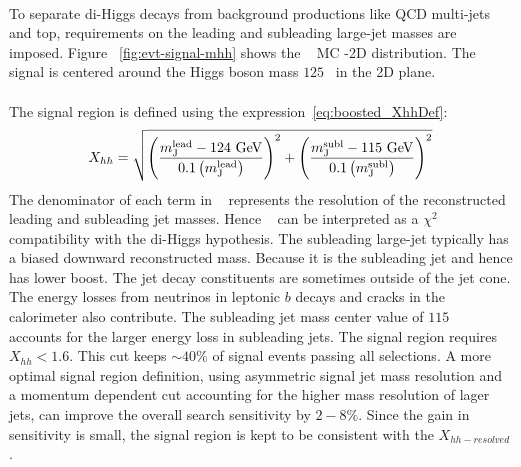 \paragraph{}
To separate di-Higgs decays from background productions like QCD multi-jets and top, requirements on the leading and subleading large-\R jet masses are imposed.
Figure ~\ref{fig:evt-signal-mhh} shows the \Grav~ MC \mleadJ-\msublJ 2D distribution.
The signal is centered around the Higgs boson mass $125$\GeV~ in the 2D plane.

\paragraph{}
The signal region is defined using the expression~\ref{eq:boosted_XhhDef}:
\begin{equation}
\label{eq:boosted_XhhDef}
X_{hh} = \sqrt{\left(\frac{m^{\rm lead}_{\rm J} - \text{124 GeV}}{0.1 \left(m^{\rm lead}_{\rm J}\right)}\right)^2 + \left(\frac{m^{\rm subl}_{\rm J}- \text{115 GeV}}{0.1 \left(m^{\rm subl}_{\rm J}\right)}\right)^2}
\end{equation}
The denominator of each term in \Xhh~ represents the resolution of the reconstructed leading and subleading jet masses.
Hence \Xhh~ can be interpreted as a $\chi^2$ compatibility with the di-Higgs hypothesis.
The subleading large-\R jet typically has a biased downward reconstructed mass.
Because it is the subleading jet and hence has lower boost.
The jet decay constituents are sometimes outside of the jet cone.
The energy losses from neutrinos in leptonic $b$ decays and cracks in the calorimeter also contribute.
The subleading jet mass center value of $115$\GeV~ accounts for the larger energy loss in subleading jets.
The signal region requires $X_{hh} < 1.6$. 
This cut keeps $\sim 40\%$ of signal events passing all selections. 
A more optimal signal region definition, using asymmetric signal jet mass resolution and a momentum dependent cut accounting for the higher mass resolution of lager \pt~ jets, can improve the overall search sensitivity by $2-8\%$.
Since the gain in sensitivity is small, the signal region is kept to be consistent with the $X_{hh-resolved}$.


